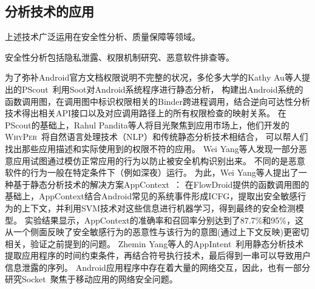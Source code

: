 \subsection{分析技术的应用}

上述技术广泛运用在安全性分析、质量保障等领域。


安全性分析包括隐私泄露、权限机制研究、恶意软件排查等。

为了弥补Android官方文档权限说明不完整的状况，多伦多大学的Kathy Au等人提出的PScout~\cite{au2012pscout}利用Soot对Android系统程序进行静态分析，
构建出Android系统的函数调用图，在调用图中标识权限相关的Binder跨进程调用，结合逆向可达性分析技术得出相关API接口以及对应调用路径上的所有权限检查的映射关系。
在PScout的基础上，Rahul Pandita等人将目光聚焦到应用市场上，他们开发的\textsc{WhyPer}~\cite{pandita2013whyper}将自然语言处理技术（NLP）和传统静态分析技术相结合，
可以帮人们找出那些应用描述和实际使用到的权限不符的应用。
Wei Yang等人发现一部分恶意应用试图通过模仿正常应用的行为以防止被安全机构识别出来。%
不同的是恶意软件的行为一般在特定条件下（例如深夜）运行。
为此，Wei Yang等人提出了一种基于静态分析技术的解决方案AppContext~\cite{yang2015appcontext}：
在FlowDroid提供的函数调用图的基础上，AppContext结合Android常见的系统事件形成ICFG，提取出安全敏感行为的上下文，并利用SVM技术对这些信息进行机器学习，得到最终的安全检测模型。
实验结果显示，AppContext的准确率和召回率分别达到了87.7\%和95\%，这从一个侧面反映了安全敏感行为的恶意性与该行为的意图(通过上下文反映)更密切相关，验证之前提到的问题。
Zhemin Yang等人的AppIntent~\cite{yang2013appintent}利用静态分析技术提取应用程序的时间约束条件，再结合符号执行技术，最后得到一串可以导致用户信息泄露的序列。
Android应用程序中存在着大量的网络交互，因此，也有一部分研究Socket~\cite{Shao2016The,Jia2017Open,bu2017program}聚焦于移动应用的网络安全问题。




